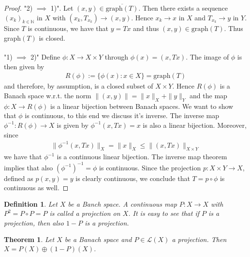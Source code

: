 \documentclass[11pt,a4paper]{article}
\newtheorem{thm}{Theorem}[section]
\newtheorem{defn}{Definition}[section]
\theoremstyle{definition}
\begin{document}
\begin{proof}
"2) $\implies$ 1)". Let $(x,y) \in \overline{\text{graph}(T)}$. Then there exists a sequence $(x_k)_{k \in \mathbb{N}}$ in $X$ with $(x_k, T_{x_k}) \to (x,y)$. Hence $x_k \to x$ in $X$ and $T_{x_k} \to y$ in $Y$. Since $T$ is continuous, we have that $y=Tx$ and thus $(x,y) \in \text{graph}(T)$. Thus graph$(T)$ is closed. 
\\\\
"1) $\implies$ 2)" Define $\phi : X \to X \times Y$ through $\phi(x)= (x,Tx)$. The image of $\phi$ is then given by 
\begin{align*}
R(\phi):= \lbrace \phi(x) : x \in X \rbrace = \text{graph}(T)
\end{align*}
and therefore, by assumption, is a closed subset of $X \times Y$. Hence $R( \phi)$ is a Banach space w.r.t. the norm $\|(x,y)\|= \|x\|_X + \|y\|_Y$ and the map $\phi: X \to R(\phi)$ is a linear bijection between Banach spaces. We want to show that $\phi$ is continuous, to this end we discuss it's inverse. The inverse map $\phi^{-1} : R( \phi) \to X$ is given by $\phi^{-1}(x,Tx)=x$ is also a linear bijection. Moreover, since
\begin{align*}
\|\phi^{-1}(x,Tx)\|_X = \|x\|_X \leq \|(x,Tx)\|_{X \times Y}
\end{align*}
we have that $\phi^{-1}$ is a continuous linear bijection. The inverse map theorem implies that also $(\phi^{-1})^{-1}=\phi$ is continuous. Since the projection $p: X \times Y \to X$, defined as $p(x,y)=y$ is clearly continuous, we conclude that $T = p \circ \phi$ is continuous as well. 
\end{proof}
\begin{defn} Let $X$ be a Banch space. A continuous map $P: X \to X$ with $P^2=P \circ P = P$ is called a projection on $X$. It is easy to see that if $P$ is a projection, then also $1-P$ is a projection. 
\end{defn}
\begin{thm} Let $X$ be a Banach space and $P \in \mathcal{L}(X)$ a projection. Then $X=P(X) \oplus (1-P)(X)$. 
\end{thm}
\end{document}
